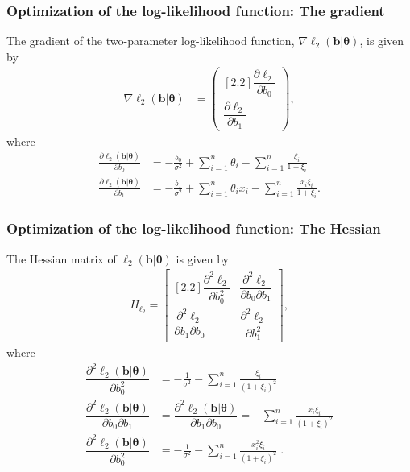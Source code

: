 \documentclass[11pt, letterpaper]{article}
\numberwithin{equation}{section}
\begin{document}
\subsubsection{Optimization of the log-likelihood function: The gradient}
The gradient of the two-parameter log-likelihood function, $\nabla \ell_2(\bm b | \bm \theta)$, is given by
\begin{align*}
\nabla \ell_2(\bm b | \bm \theta) &= \begin{pmatrix}[2.2]
\dfrac{\partial \ell_2}{\partial b_0}   \\
\dfrac{\partial \ell_2}{\partial b_1}  
\end{pmatrix},
\end{align*}
where 
\begin{align*}
\frac{\partial \ell_2 (\bm b | \bm \theta)}{\partial b_0}   &= -\frac{b_0}{\sigma^2} + \sum_{i=1}^n \theta_i - \sum_{i=1}^n \frac{\xi_i }{1+\xi_i} \\
\frac{\partial \ell_2 (\bm b | \bm \theta)}{\partial b_1}   &= -\frac{b_1}{\sigma^2} + \sum_{i=1}^n \theta_i x_i - \sum_{i=1}^n \frac{x_i \xi_i }{1+\xi_i}.
\end{align*}

\subsubsection{Optimization of the log-likelihood function: The Hessian}
The Hessian matrix of $\ell_2(\bm b | \bm \theta)$ is given by
\begin{align*}
H_{\ell_2} = \begin{bmatrix}[2.2]
\dfrac{\partial^2 \ell_2}{\partial b_0 ^2} & \dfrac{\partial^2 \ell_2}{\partial b_0 \partial b_1} \\
\dfrac{\partial^2 \ell_2}{\partial b_1  \partial b_0} & \dfrac{\partial^2 \ell_2}{\partial b_1^2} 
\end{bmatrix},
\end{align*}
where 
\begin{align*}
\dfrac{\partial^2 \ell_2(\bm b | \bm \theta)}{\partial b_0 ^2} &= -\frac{1}{\sigma^2} - \sum_{i=1}^n \frac{\xi_i }{\left(1+\xi_i\right)^2} \\
\dfrac{\partial^2 \ell_2(\bm b | \bm \theta)}{\partial b_0 \partial b_1} &= \dfrac{\partial^2 \ell_2(\bm b | \bm \theta)}{\partial b_1 \partial b_0} =  - \sum_{i=1}^n \frac{x_i \xi_i }{\left(1+\xi_i\right)^2} \\
\dfrac{\partial^2 \ell_2(\bm b | \bm \theta)}{\partial b_0 ^2} &= -\frac{1}{\sigma^2} - \sum_{i=1}^n \frac{x_i^2\xi_i }{\left(1+\xi_i\right)^2} \;. \\
\end{align*}
\end{document}
